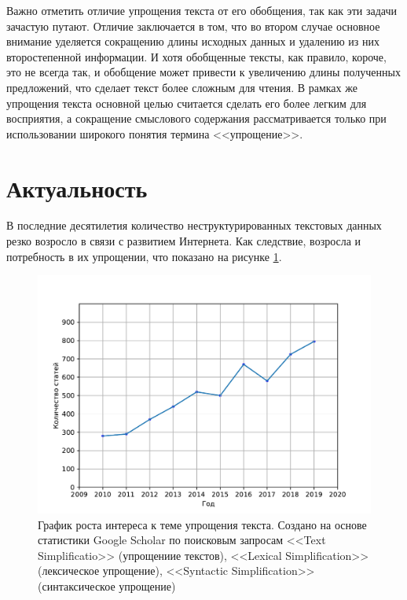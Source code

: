 Важно отметить отличие упрощения текста от его обобщения, так как эти задачи зачастую путают. Отличие заключается в том, что во втором случае основное внимание уделяется сокращению длины исходных данных и удалению из них второстепенной информации. И хотя обобщенные тексты, как правило, короче, это не всегда так, и обобщение может привести к увеличению длины полученных предложений\cite{shardlow_survey_2014}, что сделает текст более сложным для чтения. В рамках же упрощения текста основной целью считается сделать его более легким для восприятия, а сокращение смыслового содержания рассматривается только при использовании широкого понятия термина <<упрощение>>.

\section{Актуальность}
В последние десятилетия количество неструктурированных текстовых данных резко возросло в связи с развитием Интернета. Как следствие, возросла и потребность в их упрощении, что показано на рисунке \ref{fig:growth_of_interest}. 

\captionsetup{justification=centering,singlelinecheck=off}
\begin{figure}[h!]
	\centering
		\includegraphics[pages=-, scale=0.8]{./inc/img/graph.pdf}
		\caption{График роста интереса к теме упрощения текста. Создано на основе статистики Google Scholar по поисковым запросам <<Text Simplificatio>> (упрощениие текстов),  <<Lexical Simplification>> (лексическое упрощение), <<Syntactic Simplification>> (синтаксическое упрощение)\cite{sikka_survey_2020}}  
		\label{fig:growth_of_interest}
\end{figure}


